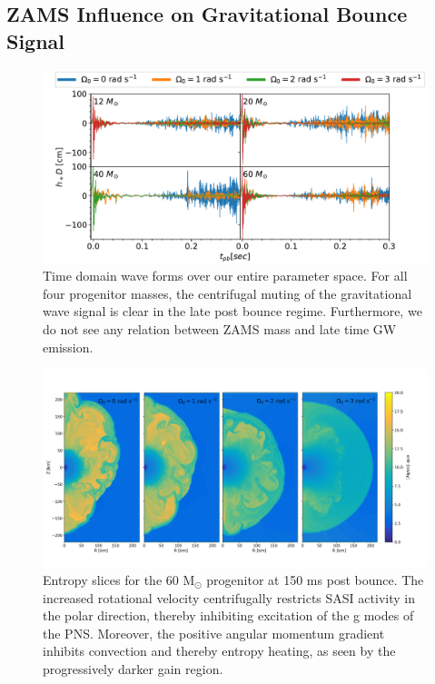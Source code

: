 \documentclass[twocolumn,times]{aastex62}  %
\newcommand{\Msun}{\ensuremath{\mathrm{M}_\odot}\xspace}
\begin{document}



\subsection{ZAMS Influence on Gravitational Bounce Signal}

\begin{figure}[t]
\includegraphics[width=\textwidth]{figures/ccsn2D_M1_all.pdf}
\centering
\caption{Time domain wave forms over our entire parameter space.  For all four progenitor masses, the centrifugal muting of the gravitational wave signal is clear in the late post bounce regime.    Furthermore, we do not see any relation between ZAMS mass and late time GW emission.}
\label{fig:ccsn_all}
\end{figure}

\begin{figure}[t!]
  \centering     %
  \includegraphics[width=\textwidth]{figures/entr_slice_2.pdf}
  \caption{Entropy slices for the 60 \Msun progenitor at 150 ms post bounce.  The increased rotational velocity centrifugally restricts SASI activity in the polar direction, thereby inhibiting excitation of the g modes of the PNS.  Moreover, the positive angular momentum gradient inhibits convection and thereby entropy heating, as seen by the progressively darker gain region.}
  \label{fig:entr_slice}
\end{figure}
\end{document}
